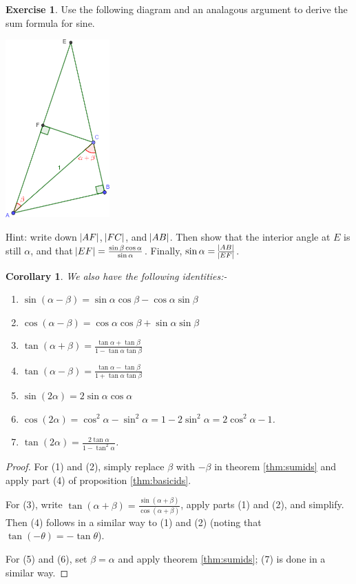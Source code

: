 \documentclass[a4paper,leqno]{article}
\numberwithin{equation}{section}
\newtheorem{cor}[equation]{Corollary}
\theoremstyle{definition}
\newtheorem{exercise}[equation]{Exercise}
\theoremstyle{remark}
\begin{document}
\begin{exercise}
  Use the following diagram and an analagous argument to derive the sum formula for sine.
  \begin{center}
    \includegraphics[width=0.3\textwidth]{sinesum}
  \end{center}
  Hint: write down $ \abs{AF} $, $ \abs{FC} $, and $ \abs{AB} $. Then show that the interior angle at $ E $ is still $ \alpha $,
  and that $ \abs{EF} = \frac{\sin\beta \cos\alpha}{\sin \alpha} $. Finally, $ \sin \alpha = \frac{\abs{AB}}{\abs{EF}} $.
\end{exercise}

\begin{cor}
  We also have the following identities:-
  \begin{enumerate}
    \item $ \sin(\alpha - \beta) = \sin \alpha \cos \beta - \cos \alpha \sin \beta $
    \item $ \cos(\alpha - \beta) = \cos \alpha \cos \beta + \sin \alpha \sin \beta $
    \item $ \tan(\alpha + \beta) = \frac{\tan \alpha + \tan \beta}{1 - \tan \alpha \tan \beta} $
    \item $ \tan(\alpha - \beta) = \frac{\tan \alpha - \tan \beta}{1 + \tan \alpha \tan \beta} $
    \item $ \sin(2\alpha) = 2 \sin \alpha \cos \alpha $
    \item $ \cos(2\alpha) = \cos^2 \alpha - \sin^2 \alpha = 1 - 2\sin^2 \alpha = 2\cos^2 \alpha - 1 $.
    \item $ \tan(2\alpha) = \frac{2\tan \alpha}{1 - \tan^2 \alpha} $.
  \end{enumerate}
\end{cor}
\begin{proof}
  For (1) and (2), simply replace $ \beta $ with $ -\beta $ in theorem \ref{thm:sumids} and apply part (4) of proposition \ref{thm:basicids}.

  For (3), write $ \tan(\alpha + \beta) = \frac{\sin(\alpha + \beta)}{\cos(\alpha + \beta)} $, apply parts (1) and (2), and simplify. Then (4)
  follows in a similar way to (1) and (2) (noting that $ \tan (-\theta) = -\tan \theta $).

  For (5) and (6), set $ \beta = \alpha $ and apply theorem \ref{thm:sumids}; (7) is done in a similar way.
\end{proof}
\end{document}
